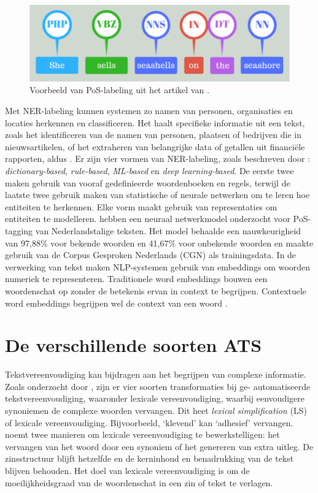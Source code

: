 \begin{center}
	\begin{figure}[H]
		\includegraphics[width=15cm]{img/poslabeling.png}
		\caption{Voorbeeld van PoS-labeling uit het artikel van \textcite{Bilisci2021}.}
		\label{fig:pos-labeling}
	\end{figure}
\end{center}

Met NER-labeling kunnen systemen zo namen van personen, organisaties en locaties herkennen en classificeren. Het haalt specifieke informatie uit een tekst, zoals het identificeren van de namen van personen, plaatsen of bedrijven die in nieuwsartikelen, of het extraheren van belangrijke data of getallen uit financiële rapporten, aldus \textcite{Jurafsky2014}. Er zijn vier vormen van NER-labeling, zoals beschreven door \textcite{Li2018}: \textit{dictionary-based}, \textit{rule-based}, \textit{ML-based} en \textit{deep learning-based}. De eerste twee maken gebruik van vooraf gedefinieerde woordenboeken en regels, terwijl de laatste twee gebruik maken van statistische of neurale netwerken om te leren hoe entiteiten te herkennen. Elke vorm maakt gebruik van representaties om entiteiten te modelleren. \textcite{Poel2008} hebben een neuraal netwerkmodel onderzocht voor PoS-tagging van Nederlandstalige teksten. Het model behaalde een nauwkeurigheid van 97,88\% voor bekende woorden en 41,67\% voor onbekende woorden en maakte gebruik van de Corpus Gesproken Nederlands (CGN) als trainingsdata. In de verwerking van tekst maken NLP-systemen gebruik van embeddings om woorden numeriek te representeren. Traditionele word embeddings bouwen een woordenschat op zonder de betekenis ervan in context te begrijpen. Contextuele word embeddings begrijpen wel de context van een woord \autocite{Eisenstein2019}. 

\section{De verschillende soorten ATS}

Tekstvereenvoudiging kan bijdragen aan het begrijpen van complexe informatie. Zoals onderzocht door \textcite{Siddharthan2014}, zijn er vier soorten transformaties bij ge- automatiseerde tekstvereenvoudiging, waaronder lexicale vereenvoudiging, waarbij eenvoudigere synoniemen de complexe woorden vervangen. Dit heet \textit{lexical simplification} (LS) of lexicale vereenvoudiging. Bijvoorbeeld, ‘klevend’ kan ‘adhesief’ vervangen. \textcite{Kandula2010} noemt twee manieren om lexicale vereenvoudiging te bewerkstelligen: het vervangen van het woord door een synoniem of het genereren van extra uitleg. De zinsstructuur blijft hetzelfde en de kerninhoud en benadrukking van de tekst blijven behouden. Het doel van lexicale vereenvoudiging is om de moeilijkheidsgraad van de woordenschat in een zin of tekst te verlagen.

